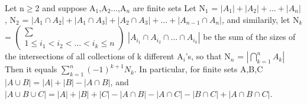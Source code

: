 \documentclass[10pt]{article}
\begin{document}
Let n$\geq$2 and suppose A$_1$,A$_2 \dots $,A$_n$ are finite sets Let N$_1$ = $|A_1|+|A_2|+\dots + |A_n|$, N$_2$ = $|A_1 \cap A_2|+ |A_1 \cap A_3|+ |A_2 \cap A_3|+ \dots + |A_{n-1} \cap A_n| $,
and similarily, let 
N$_k$ = \fontsize{6}{5} $\left(\begin{array}{c} \sum \\  1\leq i_1<i_2<\dots <i_k \leq n \end{array} \right)$ \fontsize{12}{10} $|A_{i_1} \cap A_{i_2} \cap \dots \cap A_{i_k}|$
be the sum of the sizes of the intersections of all collections of k different A$_i$'s, so that
N$_n$ = $|\bigcap_{k=1}^n A_k|$ Then it equals $\sum_{k=1}^{n} (-1)^{k+1}N_k.$
In particular, for finite sets A,B,C
$|A\cup B| = |A| +|B| -|A \cap B|$,
and
$|A\cup B\cup C| = |A|+|B|+|C|-|A\cap B|-|A\cap C|-|B\cap C|+|A\cap B\cap C|$.
\end{document}
